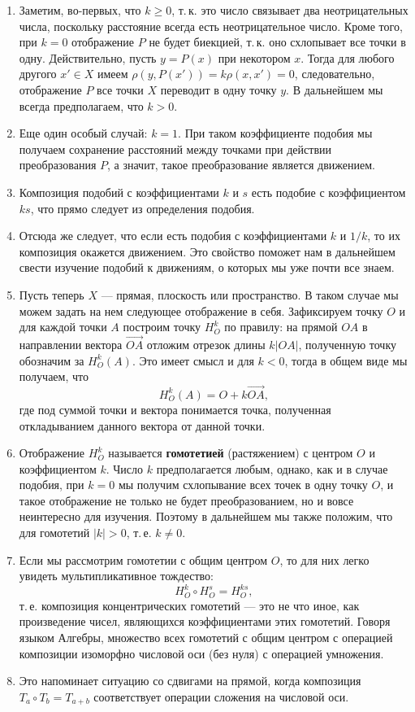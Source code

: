 \begin{enumerate}
\item Заметим, во-первых, что $k\ge 0$, т.\,к. это число связывает два неотрицательных числа, поскольку расстояние всегда есть неотрицательное число. Кроме того, при $k=0$ отображение $P$ не будет биекцией, т.\,к. оно схлопывает все точки в одну. Действительно, пусть $y=P(x)$ при некотором $x$. Тогда для любого другого $x'\in X$ имеем $\rho(y,P(x'))=k\rho(x,x')=0$, следовательно, отображение $P$ все точки $X$ переводит в одну точку $y$. 
В дальнейшем мы всегда предполагаем, что $k>0$.
\item Еще один особый случай: $k=1$. При таком коэффициенте подобия мы получаем сохранение расстояний между точками при действии преобразования $P$, а значит, такое преобразование является движением.
\item Композиция подобий с коэффициентами $k$ и $s$ есть подобие с коэффициентом $ks$, что прямо следует из определения подобия.
\item Отсюда же следует, что если есть подобия с коэффициентами $k$ и $1/k$, то их композиция окажется движением. Это свойство поможет нам в дальнейшем свести изучение подобий к движениям, о которых мы уже почти все знаем.

\item Пусть теперь $X$ --- прямая, плоскость или пространство. В таком случае мы можем задать на нем следующее отображение в себя. Зафиксируем точку $O$ и для каждой точки $A$ построим точку $H_O^k$ по правилу: на прямой $OA$ в направлении вектора $\vec{OA}$ отложим отрезок длины $k|OA|$, полученную точку обозначим за $H_O^k(A)$. 
Это имеет смысл и для $k<0$, тогда в общем виде мы получаем, что 
$$
H_O^k(A) = O + k\vec{OA},
$$
где под суммой точки и вектора понимается точка, полученная откладыванием данного вектора от данной точки.

\item Отображение $H_O^k$ называется \textbf{гомотетией} (растяжением) с центром $O$ и коэффициентом $k$. Число $k$ предполагается любым, однако, как и в случае подобия, при $k=0$ мы получим схлопывание всех точек в одну точку $O$, и такое отображение не только не будет преобразованием, но и вовсе неинтересно для изучения. Поэтому в дальнейшем мы также положим, что для гомотетий $|k|>0$, т.\,е. $k\ne 0$.
\item Если мы рассмотрим гомотетии с общим центром $O$, то для них легко увидеть мультипликативное тождество:
$$
H_O^k\circ H_O^s = H_O^{ks},
$$
т.\,е. композиция концентрических гомотетий --- это не что иное, как произведение чисел, являющихся коэффициентами этих гомотетий. Говоря языком Алгебры, множество всех гомотетий с общим центром с операцией композиции изоморфно числовой оси (без нуля) с операцией умножения.
\item Это напоминает ситуацию со сдвигами на прямой, когда композиция $T_a\circ T_b=T_{a+b}$ соответствует операции сложения на числовой оси.


\end{enumerate}
